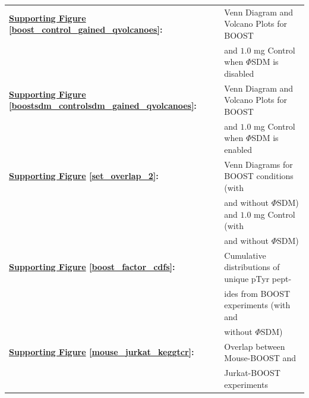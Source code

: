 \documentclass[journal=jprobs,manuscript=article]{achemso}
\begin{document}
\begin{table}[h!]
    \begin{tabular}{ll}

        \textbf{\hyperref[boost_control_gained_qvolcanoes]{Supporting Figure} \ref{boost_control_gained_qvolcanoes}:} & Venn Diagram and Volcano Plots for BOOST  \\
                                                                                                                                                                                                       &  and $1.0$ mg Control when $\Phi$SDM is disabled \\

        \textbf{\hyperref[boostsdm_controlsdm_gained_qvolcanoes]{Supporting Figure} \ref{boostsdm_controlsdm_gained_qvolcanoes}:} & Venn Diagram and Volcano Plots for BOOST  \\
                                                                                                                                                                                                       &  and $1.0$ mg Control when $\Phi$SDM is enabled \\

        \textbf{\hyperref[set_overlap_2]{Supporting Figure} \ref{set_overlap_2}:} & Venn Diagrams for BOOST conditions (with   \\
                                                                                                                                       & and without $\Phi$SDM) and $1.0$ mg Control (with \\
                                                                                                                                       & and without $\Phi$SDM)\\

        \textbf{\hyperref[boost_factor_cdfs]{Supporting Figure} \ref{boost_factor_cdfs}:} & Cumulative distributions of unique pTyr pept- \\
                                                                                                                                                    & ides from BOOST experiments (with and \\
                                                                                                                                       & without $\Phi$SDM)\\

	\textbf{\hyperref[mouse_jurkat_keggtcr]{Supporting Figure} \ref{mouse_jurkat_keggtcr}:} &  Overlap between Mouse-BOOST and \\
                                                                                                                                                               & Jurkat-BOOST experiments \\

    \end{tabular}
\end{table}
\end{document}
